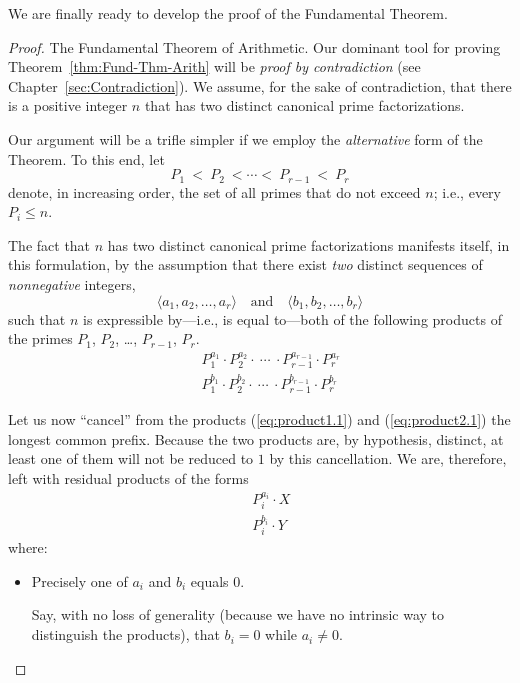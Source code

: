 We are finally ready to develop the proof of the Fundamental Theorem.

\begin{proof}
{\small\sf The Fundamental Theorem of Arithmetic.}
%
Our dominant tool for proving Theorem~\ref{thm:Fund-Thm-Arith} will be
{\em proof by contradiction} (see Chapter~\ref{sec:Contradiction}).
We assume, for the sake of contradiction, that there is a positive
integer $n$ that has two distinct canonical prime factorizations.

Our argument will be a trifle simpler if we employ the {\em alternative} 
form of the Theorem.  To this end, let
\[ P_1 \ < \ P_2 \ < \cdots < \ P_{r-1} \ < \ P_r \]
denote, in increasing order, the set of all primes that do not exceed
$n$; i.e., every $P_i \leq n$.

The fact that $n$ has two distinct canonical prime factorizations
manifests itself, in this formulation, by the assumption that there
exist {\em two} distinct sequences of {\em nonnegative} integers, 
\[ \langle a_1, a_2, \ldots, a_r \rangle \ \ \ \mbox{ and } \ \ \
\langle b_1, b_2, \ldots, b_r \rangle 
\]
such that $n$ is expressible by---i.e., is equal to---both of the
following products of the primes $P_1$, $P_2$, \ldots, $P_{r-1}$, $P_r$.
\begin{eqnarray}
 & & 
\label{eq:product1.1}
P_1^{a_1} \cdot P_2^{a_2} \cdot \ \cdots \ \cdot P_{r-1}^{a_{r-1}}
\cdot P_r^{a_r} \\
 & &
\label{eq:product2.1}
P_1^{b_1} \cdot P_2^{b_2} \cdot \ \cdots \ \cdot P_{r-1}^{b_{r-1}}
\cdot P_r^{b_r}
\end{eqnarray}

Let us now ``cancel'' from the products (\ref{eq:product1.1}) and
(\ref{eq:product2.1}) the longest common prefix.  Because the two
products are, by hypothesis, distinct, at least one of them will not
be reduced to $1$ by this cancellation.  We are, therefore, left with
residual products of the forms
\begin{eqnarray}
 & &
\label{eq:product1.2}
P_i^{a_i} \cdot X \\
 & &
\label{eq:product2.2}
P_i^{b_i} \cdot Y
\end{eqnarray}
where:
\begin{itemize}
\item
Precisely one of $a_i$ and $b_i$ equals $0$.

Say, with no loss of generality (because we have no intrinsic way to
distinguish the products), that $b_i =0$ while $a_i \neq 0$.


\end{itemize}
\end{proof}
